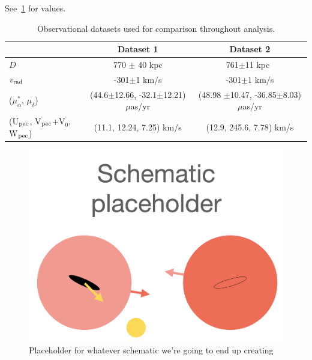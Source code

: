 \documentclass[twocolumn]{aastex631}
\newcommand{\mud}{\mu_\delta}
\newcommand{\mua}{\mu_\alpha^*}
\begin{document}
See~\ref{table:data} for values.
\begin{table}
  \centering
  \begin{tabular}{lc|c}
    \hline\hline
                    & Dataset 1                     & Dataset 2 \\\hline
  $D$               &  770 $\pm$ 40 \rm kpc\cite{}     &   761$\pm$11 \rm kpc~\cite{Li2021}        \\
  $v_{\rm rad}$     &     -301$\pm$1 km/s       &   -301$\pm$1 km/s        \\
  ($\mu_\alpha^*$,  $\mu_\delta$)    & (44.6$\pm$12.66, -32.1$\pm$12.21) $\mu$as/yr\cite{} & (48.98 $\pm$10.47, -36.85$\pm$8.03) $\mu$as/yr \cite{Salomon2021}\\ 
  (U$_{\rm pec}$, V$_{\rm pec}$+V$_0$, W$_{\rm pec}$) & (11.1, 12.24, 7.25) km/s& (12.9, 245.6, 7.78) km/s \cite{Drimmel2018}\\
  \hline\hline
  
  \end{tabular}
  \caption{\label{table:data}Observational datasets used for comparison throughout analysis.}
\end{table}


\begin{figure}[htb]
    \centering
    \includegraphics[width=0.8\columnwidth]{schematic_placeholder.png}
    \caption{\label{fig:schematic} Placeholder for whatever schematic we're going to end up creating
    }
  \end{figure}
\end{document}

